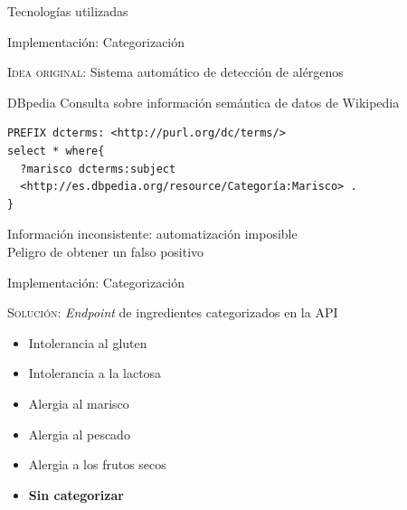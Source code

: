 \documentclass[10pt,xcolor=svgnames]{beamer}
\begin{document}
\begin{frame}{Tecnologías utilizadas}
\begin{minipage}[t]{.4\textwidth}
\begin{figure}[H]
    \end{figure}
  \end{minipage}
\end{frame}


\begin{frame}[fragile]{Implementación: Categorización}

  \begin{cambiarmargen}{-0.5cm}{-0.5cm}
    \textcolor{naranja}{\textsc{Idea original}}: Sistema automático de detección
    de alérgenos

    \begin{block}{DBpedia}
      Consulta sobre información semántica de datos de Wikipedia
    \end{block}

    
    \begin{verbatim}
PREFIX dcterms: <http://purl.org/dc/terms/>
select * where{
  ?marisco dcterms:subject
  <http://es.dbpedia.org/resource/Categoría:Marisco> .
}
    \end{verbatim}

    \vspace*{0.5cm}
    
    \then{} Información inconsistente: automatización imposible\\
    \then{} Peligro de obtener un falso positivo
  \end{cambiarmargen}
\end{frame}



\begin{frame}{Implementación: Categorización}

  \textcolor{naranja}{\textsc{Solución}}: \textit{Endpoint} de ingredientes
  categorizados en la API

  \begin{itemize}
  \item Intolerancia al gluten
  \item Intolerancia a la lactosa
  \item Alergia al marisco
  \item Alergia al pescado
  \item Alergia a los frutos secos
  \item \textbf{Sin categorizar}
  \end{itemize}
  
\end{frame}
\end{document}
